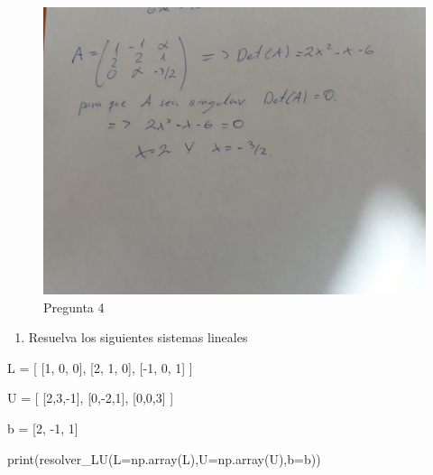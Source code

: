 \documentclass[
  letterpaper,
  DIV=11,
  numbers=noendperiod]{scrartcl}
\newenvironment{Shaded}{\begin{snugshade}}{\end{snugshade}}
\newcommand{\BuiltInTok}[1]{\textcolor[rgb]{0.00,0.23,0.31}{#1}}
\newcommand{\DecValTok}[1]{\textcolor[rgb]{0.68,0.00,0.00}{#1}}
\newcommand{\NormalTok}[1]{\textcolor[rgb]{0.00,0.23,0.31}{#1}}
\newcommand{\OperatorTok}[1]{\textcolor[rgb]{0.37,0.37,0.37}{#1}}
\providecommand{\tightlist}{%
  \setlength{\itemsep}{0pt}\setlength{\parskip}{0pt}}\usepackage{longtable,booktabs,array}
\begin{document}
\begin{figure}[H]

{\centering \includegraphics{images/image.jpeg}

}

\caption{Pregunta 4}

\end{figure}%

\begin{enumerate}
\def\labelenumi{\arabic{enumi}.}
\setcounter{enumi}{4}
\tightlist
\item
  Resuelva los siguientes sistemas lineales
\end{enumerate}

\begin{Shaded}
\begin{Highlighting}[]
\NormalTok{L }\OperatorTok{=}\NormalTok{ [}
\NormalTok{    [}\DecValTok{1}\NormalTok{, }\DecValTok{0}\NormalTok{, }\DecValTok{0}\NormalTok{],}
\NormalTok{    [}\DecValTok{2}\NormalTok{, }\DecValTok{1}\NormalTok{, }\DecValTok{0}\NormalTok{],}
\NormalTok{    [}\OperatorTok{{-}}\DecValTok{1}\NormalTok{, }\DecValTok{0}\NormalTok{, }\DecValTok{1}\NormalTok{]}
\NormalTok{]}

\NormalTok{U }\OperatorTok{=}\NormalTok{ [}
\NormalTok{    [}\DecValTok{2}\NormalTok{,}\DecValTok{3}\NormalTok{,}\OperatorTok{{-}}\DecValTok{1}\NormalTok{],}
\NormalTok{    [}\DecValTok{0}\NormalTok{,}\OperatorTok{{-}}\DecValTok{2}\NormalTok{,}\DecValTok{1}\NormalTok{],}
\NormalTok{    [}\DecValTok{0}\NormalTok{,}\DecValTok{0}\NormalTok{,}\DecValTok{3}\NormalTok{]}
\NormalTok{]}

\NormalTok{b }\OperatorTok{=}\NormalTok{ [}\DecValTok{2}\NormalTok{, }\OperatorTok{{-}}\DecValTok{1}\NormalTok{, }\DecValTok{1}\NormalTok{]}

\BuiltInTok{print}\NormalTok{(resolver\_LU(L}\OperatorTok{=}\NormalTok{np.array(L),U}\OperatorTok{=}\NormalTok{np.array(U),b}\OperatorTok{=}\NormalTok{b))}
\end{Highlighting}
\end{Shaded}
\end{document}
